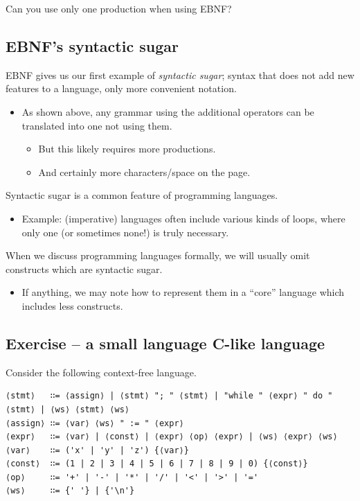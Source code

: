 \documentclass[11pt]{article}
\theoremstyle{definition}
\begin{document}
Can you use only one production when using EBNF?

\subsection{EBNF's syntactic sugar}
\label{sec:org389f5f9}
EBNF gives us our first example of \emph{syntactic sugar};
syntax that does not add new features to a language,
only more convenient notation.
\begin{itemize}
\item As shown above, any grammar using the additional operators
can be translated into one not using them.
\begin{itemize}
\item But this likely requires more productions.
\item And certainly more characters/space on the page.
\end{itemize}
\end{itemize}

Syntactic sugar is a common feature of programming languages.
\begin{itemize}
\item Example: (imperative) languages often include various kinds of loops,
where only one (or sometimes none!) is truly necessary.
\end{itemize}

When we discuss programming languages formally,
we will usually omit constructs which are syntactic sugar.
\begin{itemize}
\item If anything, we may note how to represent them
in a “core” language which includes less constructs.
\end{itemize}

\subsection{Exercise – a small language C-like language}
\label{sec:orgd713927}
Consider the following context-free language.
\begin{verbatim}
⟨stmt⟩   ∷= ⟨assign⟩ | ⟨stmt⟩ "; " ⟨stmt⟩ | "while " ⟨expr⟩ " do " ⟨stmt⟩ | ⟨ws⟩ ⟨stmt⟩ ⟨ws⟩
⟨assign⟩ ∷= ⟨var⟩ ⟨ws⟩ " := " ⟨expr⟩
⟨expr⟩   ∷= ⟨var⟩ | ⟨const⟩ | ⟨expr⟩ ⟨op⟩ ⟨expr⟩ | ⟨ws⟩ ⟨expr⟩ ⟨ws⟩
⟨var⟩    ∷= ('x' | 'y' | 'z') {⟨var⟩}
⟨const⟩  ∷= (1 | 2 | 3 | 4 | 5 | 6 | 7 | 8 | 9 | 0) {⟨const⟩}
⟨op⟩     ∷= '+' | '-' | '*' | '/' | '<' | '>' | '='
⟨ws⟩     ∷= {' '} | {'\n'}
\end{verbatim}
\end{document}
